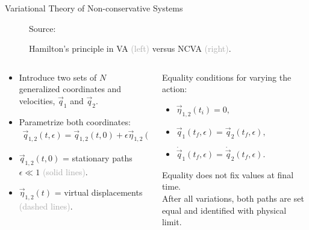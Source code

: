 \begin{frame}[c]{Variational Theory of Non-conservative Systems}
\begin{figure}[h!]
\centering
{}
 \vspace{-0.5em}
 {\fontsize{9}{9}\caption{Hamilton's principle in VA \textcolor{darkgray}{(left)} versus NCVA \textcolor{darkgray}{(right)}.}}
 \vspace{-0.25em}
  { \tiny Source: \par}
\end{figure}
\begin{columns}
\begin{column}{0.52\textwidth}
\fontsize{9}{9}\selectfont \begin{itemize} \item Introduce two sets of $N$ generalized coordinates and velocities, $\vec{q}_1$ and $\vec{q}_2$. 
\item Parametrize both coordinates: 
\begin{align}
\vec{q}_{1,2} (t, \epsilon) = \vec{q}_{1,2} (t, 0) + \epsilon \vec{\eta}_{1,2}(t). \nonumber
\end{align} 
\item $\vec{q}_{1,2} (t, 0)$ = stationary paths {\tiny $\epsilon \ll 1$  \textcolor{darkgray}{(solid lines)}}. 
\item $\vec{\eta}_{1,2}(t)$ = virtual displacements {\tiny \textcolor{darkgray}{(dashed lines)}}.
\end{itemize}
\end{column}
\begin{column}{0.5\textwidth}
Equality conditions for varying the action:
\fontsize{9}{11}\selectfont  \begin{itemize}
\item $\vec{\eta}_{1,2}(t_i) = 0, $
\item $\vec{q}_{1} (t_f, \epsilon) = \vec{q}_{2} (t_f, \epsilon), $
\item $\dot{\vec{q}}_{1} (t_f, \epsilon) = \dot{\vec{q}}_{2} (t_f, \epsilon).$
\end{itemize}
Equality does not fix values at final time. \\
After all variations, both paths are set equal and identified with physical limit.
\end{column}
\end{columns}
\end{frame}

